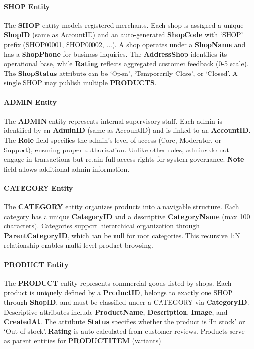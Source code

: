 \paragraph{SHOP Entity}

The \textbf{SHOP} entity models registered merchants. Each shop is assigned a unique \textbf{ShopID} (same as AccountID) and an auto-generated \textbf{ShopCode} with `SHOP' prefix (SHOP00001, SHOP00002, ...). A shop operates under a \textbf{ShopName} and has a \textbf{ShopPhone} for business inquiries. The \textbf{AddressShop} identifies its operational base, while \textbf{Rating} reflects aggregated customer feedback (0-5 scale). The \textbf{ShopStatus} attribute can be `Open', `Temporarily Close', or `Closed'. A single SHOP may publish multiple \textbf{PRODUCTS}.

\paragraph{ADMIN Entity}

The \textbf{ADMIN} entity represents internal supervisory staff. Each admin is identified by an \textbf{AdminID} (same as AccountID) and is linked to an \textbf{AccountID}. The \textbf{Role} field specifies the admin's level of access (Core, Moderator, or Support), ensuring proper authorization. Unlike other roles, admins do not engage in transactions but retain full access rights for system governance. \textbf{Note} field allows additional admin information.

\paragraph{CATEGORY Entity}
The \textbf{CATEGORY} entity organizes products into a navigable structure. Each category has a unique \textbf{CategoryID} and a descriptive \textbf{CategoryName} (max 100 characters). Categories support hierarchical organization through \textbf{ParentCategoryID}, which can be null for root categories. This recursive 1:N relationship enables multi-level product browsing.

\paragraph{PRODUCT Entity}

The \textbf{PRODUCT} entity represents commercial goods listed by shops. Each product is uniquely defined by a \textbf{ProductID}, belongs to exactly one SHOP through \textbf{ShopID}, and must be classified under a CATEGORY via \textbf{CategoryID}. Descriptive attributes include \textbf{ProductName}, \textbf{Description}, \textbf{Image}, and \textbf{CreatedAt}. The attribute \textbf{Status} specifies whether the product is `In stock' or `Out of stock'. \textbf{Rating} is auto-calculated from customer reviews. Products serve as parent entities for \textbf{PRODUCTITEM} (variants).

